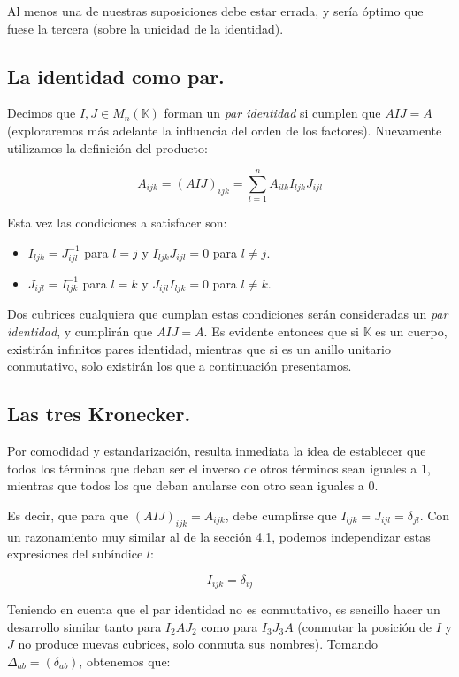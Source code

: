 Al menos una de nuestras suposiciones debe estar errada, y sería óptimo que fuese la tercera (sobre la unicidad de la identidad).

\subsection{La identidad como par.}

Decimos que $I, J \in M_{n} (\mathbb{K})$ forman un \textit{par identidad} si cumplen que $AIJ = A$ (exploraremos más adelante la influencia del orden de los factores). Nuevamente utilizamos la definición del producto:

$$A_{ijk} = (AIJ)_{ijk} = \sum\limits_{l=1}^{n} A_{ilk} I_{ljk} J_{ijl}$$

Esta vez las condiciones a satisfacer son:

\begin{itemize}
	\item $I_{ljk} = J_{ijl}^{-1}$ para $l = j$ y $I_{ljk} J_{ijl} = 0$ para $l \neq j$.
	\item $J_{ijl} = I_{ljk}^{-1}$ para $l = k$ y $J_{ijl} I_{ljk} = 0$ para $l \neq k$.
\end{itemize}

Dos cubrices cualquiera que cumplan estas condiciones serán consideradas un \textit{par identidad}, y cumplirán que $AIJ = A$. Es evidente entonces que si $\mathbb{K}$ es un cuerpo, existirán infinitos pares identidad, mientras que si es un anillo unitario conmutativo, solo existirán los que a continuación presentamos.

\subsection{Las tres Kronecker.}

Por comodidad y estandarización, resulta inmediata la idea de establecer que todos los términos que deban ser el inverso de otros términos sean iguales a $1$, mientras que todos los que deban anularse con otro sean iguales a $0$.

Es decir, que para que $(AIJ)_{ijk} = A_{ijk}$, debe cumplirse que $I_{ljk} = J_{ijl} = \delta_{jl}$. Con un razonamiento muy similar al de la sección 4.1, podemos independizar estas expresiones del subíndice $l$:

$$I_{ijk} = \delta_{ij}$$

Teniendo en cuenta que el par identidad no es conmutativo, es sencillo hacer un desarrollo similar tanto para $I_2 A J_2$ como para $I_3 J_3 A$ (conmutar la posición de $I$ y $J$ no produce nuevas cubrices, solo conmuta sus nombres). Tomando $\Delta_{ab} = (\delta_{ab})$, obtenemos que: %

